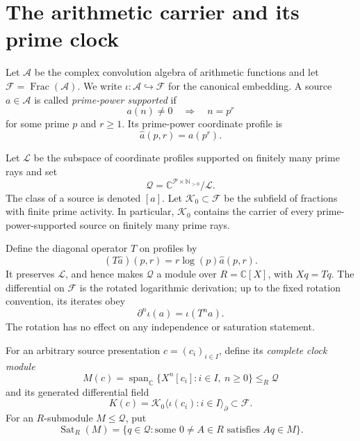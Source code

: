 \documentclass[11pt]{article}
\theoremstyle{definition}
\theoremstyle{remark}
\newcommand{\C}{\mathbb C}
\newcommand{\N}{\mathbb N}
\newcommand{\cA}{\mathcal A}
\newcommand{\cF}{\mathcal F}
\newcommand{\cK}{\mathcal K}
\newcommand{\cL}{\mathcal L}
\newcommand{\cP}{\mathcal P}
\newcommand{\cQ}{\mathcal Q}
\newcommand{\Sat}{\operatorname{Sat}}
\newcommand{\diff}{\partial}
\begin{document}
\section{The arithmetic carrier and its prime clock}\label{sec:carrier}

Let \(\cA\) be the complex convolution algebra of arithmetic functions and let
\(\cF=\operatorname{Frac}(\cA)\).  We write \(\iota:\cA\hookrightarrow\cF\) for the canonical
embedding.  A source \(a\in\cA\) is called \emph{prime-power supported} if
\[
  a(n)\neq0\quad\Longrightarrow\quad n=p^r
\]
for some prime \(p\) and \(r\geq1\).  Its prime-power coordinate profile is
\[
  \widehat a(p,r)=a(p^r).
\]

Let \(\cL\) be the subspace of coordinate profiles supported on finitely many prime rays and set
\begin{equation}\label{eq:quotient}
  \cQ=\C^{\cP\times\N_{>0}}/\cL.
\end{equation}
The class of a source is denoted \([a]\).  Let \(\cK_0\subset\cF\) be the subfield of fractions
with finite prime activity.  In particular, \(\cK_0\) contains the carrier of every
prime-power-supported source on finitely many prime rays.

Define the diagonal operator \(T\) on profiles by
\begin{equation}\label{eq:clock}
  (T\widehat a)(p,r)=r\log(p)\widehat a(p,r).
\end{equation}
It preserves \(\cL\), and hence makes \(\cQ\) a module over \(R=\C[X]\), with
\(Xq=Tq\).  The differential on \(\cF\) is the rotated logarithmic derivation; up to the fixed
rotation convention, its iterates obey
\begin{equation}\label{eq:clock-derivative}
  \diff^n\iota(a)=\iota(T^na).
\end{equation}
The rotation has no effect on any independence or saturation statement.

For an arbitrary source presentation \(c=(c_i)_{i\in I}\), define its \emph{complete clock
module}
\begin{equation}\label{eq:Mc}
  M(c)=\operatorname{span}_{\C}\{X^n[c_i]:i\in I,\ n\geq0\}\leq_R\cQ
\end{equation}
and its generated differential field
\begin{equation}\label{eq:Kc}
  K(c)=\cK_0\langle\iota(c_i):i\in I\rangle_{\diff}\subset\cF.
\end{equation}
For an \(R\)-submodule \(M\leq\cQ\), put
\begin{equation}\label{eq:saturation}
  \Sat_R(M)=\{q\in\cQ:\text{some }0\neq A\in R\text{ satisfies }Aq\in M\}.
\end{equation}
\end{document}
